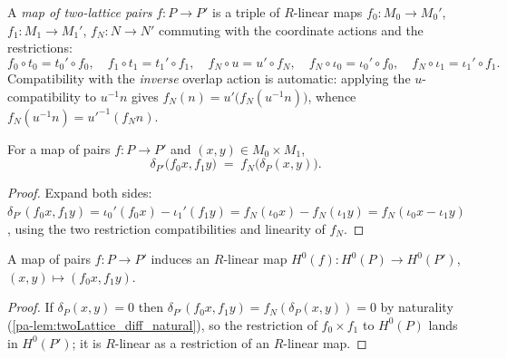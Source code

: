\begin{definition}
  \label{pa-def:twoLattice_hom}
  \leanok

  A \emph{map of two-lattice pairs} \(f : P \to P'\) is a triple of \(R\)-linear maps
  \(f_0 : M_0 \to M_0'\), \(f_1 : M_1 \to M_1'\), \(f_N : N \to N'\) commuting with the
  coordinate actions and the restrictions:
  \[
    f_0 \circ t_0 = t_0' \circ f_0, \quad
    f_1 \circ t_1 = t_1' \circ f_1, \quad
    f_N \circ u = u' \circ f_N, \quad
    f_N \circ \iota_0 = \iota_0' \circ f_0, \quad
    f_N \circ \iota_1 = \iota_1' \circ f_1 .
  \]
  Compatibility with the \emph{inverse} overlap action is automatic: applying the
  \(u\)-compatibility to \(u^{-1} n\) gives \(f_N(n) = u'\bigl(f_N(u^{-1} n)\bigr)\),
  whence \(f_N(u^{-1} n) = u'^{-1}(f_N n)\).
\end{definition}

\begin{lemma}
  \label{pa-lem:twoLattice_diff_natural}
  \leanok

  For a map of pairs \(f : P \to P'\) and \((x, y) \in M_0 \times M_1\),
  \[
    \delta_{P'}\bigl(f_0 x, f_1 y\bigr) \;=\; f_N\bigl(\delta_P(x, y)\bigr) .
  \]
\end{lemma}
\begin{proof}
  \leanok
  Expand both sides:
  \(\delta_{P'}(f_0 x, f_1 y) = \iota_0'(f_0 x) - \iota_1'(f_1 y)
  = f_N(\iota_0 x) - f_N(\iota_1 y) = f_N(\iota_0 x - \iota_1 y)\), using the two
  restriction compatibilities and linearity of \(f_N\).
\end{proof}

\begin{definition}
  \label{pa-def:twoLattice_h0Map}
  \leanok

  A map of pairs \(f : P \to P'\) induces an \(R\)-linear map
  \(H^0(f) : H^0(P) \to H^0(P')\), \((x, y) \mapsto (f_0 x, f_1 y)\).
\end{definition}
\begin{proof}
  \leanok
  If \(\delta_P(x,y) = 0\) then
  \(\delta_{P'}(f_0 x, f_1 y) = f_N(\delta_P(x,y)) = 0\) by naturality
  (\ref{pa-lem:twoLattice_diff_natural}), so the restriction of \(f_0 \times f_1\) to
  \(H^0(P)\) lands in \(H^0(P')\); it is \(R\)-linear as a restriction of an \(R\)-linear
  map.
\end{proof}

